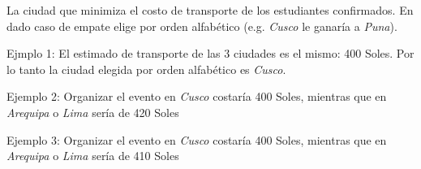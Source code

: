 \outputText

La ciudad que minimiza el costo de transporte de los estudiantes confirmados. En dado caso de empate elige por orden alfabético (e.g. \emph{Cusco} le ganaría a \emph{Puna}).

\exampleCases

\begin{example}
\end{example}

\explanationText

Ejmplo 1: El estimado de transporte de las 3 ciudades es el mismo: 400 Soles. Por lo tanto la ciudad elegida por orden alfabético es \emph{Cusco}.

Ejemplo 2:  Organizar el evento en \emph{Cusco} costaría 400 Soles, mientras que en \emph{Arequipa} o \emph{Lima} sería de 420 Soles


Ejemplo 3: Organizar el evento en \emph{Cusco} costaría 400 Soles, mientras que en \emph{Arequipa} o \emph{Lima} sería de 410 Soles
